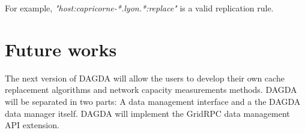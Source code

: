 For example, \textit{"host:capricorne-*.lyon.*:replace"} is a valid replication
rule.

\section{Future works}
The next version of DAGDA will allow the users to develop their own cache
replacement algorithms and network capacity measurements methods.
DAGDA will be separated in two parts: A data management interface and a the
DAGDA data manager itself. DAGDA will implement the GridRPC data management API
extension.